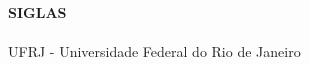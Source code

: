 
\begin{center}
\textbf{SIGLAS}
\end{center}
      \vspace{0.5cm}

\paragraph{}UFRJ - Universidade Federal do Rio de Janeiro 


\pagebreak







